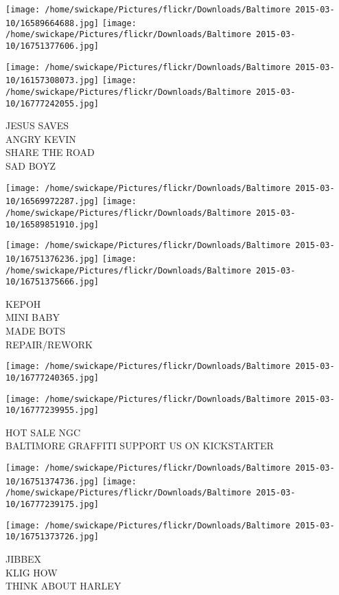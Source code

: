 \documentclass[10pt,letterpaper]{article}
\begin{document}
\texttt{[image: /home/swickape/Pictures/flickr/Downloads/Baltimore 2015-03-10/16589664688.jpg]}
\texttt{[image: /home/swickape/Pictures/flickr/Downloads/Baltimore 2015-03-10/16751377606.jpg]}

\texttt{[image: /home/swickape/Pictures/flickr/Downloads/Baltimore 2015-03-10/16157308073.jpg]}
\texttt{[image: /home/swickape/Pictures/flickr/Downloads/Baltimore 2015-03-10/16777242055.jpg]}

JESUS SAVES\\
ANGRY KEVIN\\
SHARE THE ROAD\\
SAD BOYZ
\pagebreak

\texttt{[image: /home/swickape/Pictures/flickr/Downloads/Baltimore 2015-03-10/16569972287.jpg]}
\texttt{[image: /home/swickape/Pictures/flickr/Downloads/Baltimore 2015-03-10/16589851910.jpg]}

\texttt{[image: /home/swickape/Pictures/flickr/Downloads/Baltimore 2015-03-10/16751376236.jpg]}
\texttt{[image: /home/swickape/Pictures/flickr/Downloads/Baltimore 2015-03-10/16751375666.jpg]}

KEPOH\\
MINI BABY\\
MADE BOTS\\
REPAIR/REWORK
\pagebreak

\texttt{[image: /home/swickape/Pictures/flickr/Downloads/Baltimore 2015-03-10/16777240365.jpg]}

\vspace{0.25in}
\texttt{[image: /home/swickape/Pictures/flickr/Downloads/Baltimore 2015-03-10/16777239955.jpg]}

HOT SALE NGC\\
BALTIMORE GRAFFITI SUPPORT US ON KICKSTARTER
\pagebreak

\texttt{[image: /home/swickape/Pictures/flickr/Downloads/Baltimore 2015-03-10/16751374736.jpg]}
\texttt{[image: /home/swickape/Pictures/flickr/Downloads/Baltimore 2015-03-10/16777239175.jpg]}

\vspace{0.25in}
\texttt{[image: /home/swickape/Pictures/flickr/Downloads/Baltimore 2015-03-10/16751373726.jpg]}

JIBBEX\\
KLIG HOW\\
THINK ABOUT HARLEY
\pagebreak
\end{document}
